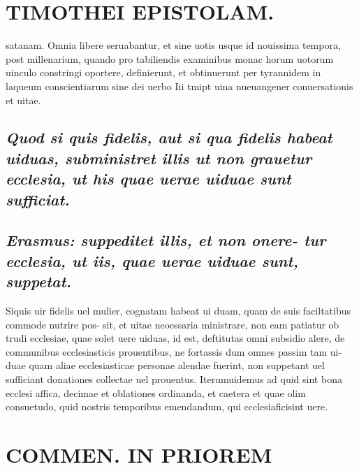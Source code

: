 \documentclass{article}
\begin{document}
\begin{pages}
\section*{TIMOTHEI EPISTOLAM. }
\marginpar{[ p.135 ]}\pstart satanam. Omnia libere seruabantur, et sine uotis usque  id nouissima tempora, post millenarium, quando pro tabiliendis examinibus monac horum uotorum uinculo constringi oportere, definierunt, et obtinuerunt per tyrannidem in laqueum conscientiarum sine dei uerbo Iii tmipt uina nueuangener conuersationis et uitae.  \pend
{}
{}
\subsection*{\textit{Quod si quis fidelis, aut si qua fidelis habeat uiduas, subministret illis ut non grauetur ecclesia, ut his quae uerae uiduae sunt sufficiat. }}
{}
\subsection*{\textit{Erasmus: suppeditet illis, et non onere- tur ecclesia, ut iis, quae uerae uiduae sunt, suppetat. }}\pstart Siquis uir fidelis uel mulier, cognatam habeat ui duam, quam de suis faciltatibus commode nutrire pos- sit, et uitae neoessaria ministrare, non eam patiatur ob trudi ecclesiae, quae solet uere uiduas, id est, deftitutas omni subsidio alere, de communibus ecclesiasticis prouentibus, ne fortassis dum omnes passim tam ui- duae quam aliae ecclesiasticae personae alendae fuerint, non suppetant uel sufficiant donationes collectae uel prouentus. Iterumuidemus ad quid sint bona ecclesi affica, decimae et oblationes ordinanda, et caetera et quae olim consuetudo, quid nostris temporibus emendandum, qui ccclesiaficisint uere.  \pend
\section*{COMMEN. IN PRIOREM }
\marginpar{[ p.136 ]}
{}

\end{pages}
\end{document}
